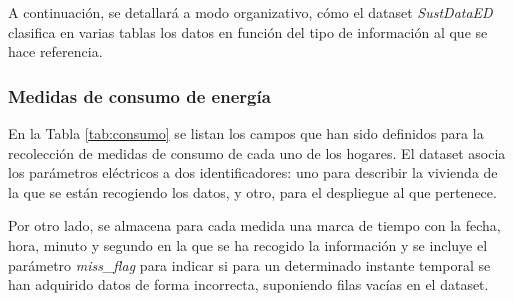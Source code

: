 \vspace{3mm}

\pagebreak

A continuación, se detallará a modo organizativo, cómo el dataset \textit{SustDataED} clasifica en varias tablas los datos en función del tipo de información al que se hace referencia.

\subsubsection{Medidas de consumo de energía}

En la Tabla \ref{tab:consumo} se listan los campos que han sido definidos para la recolección de medidas de consumo de cada uno de los hogares. El dataset asocia los parámetros eléctricos a dos identificadores: uno para describir la vivienda de la que se están recogiendo los datos, y otro, para el despliegue al que pertenece. 

\vspace{3mm}

Por otro lado, se almacena para cada medida una marca de tiempo con la fecha, hora, minuto y segundo en la que se ha recogido la información y se incluye el parámetro \textit{miss\_flag} para indicar si para un determinado instante temporal se han adquirido datos de forma incorrecta, suponiendo filas vacías en el dataset.

\vspace{3mm}

